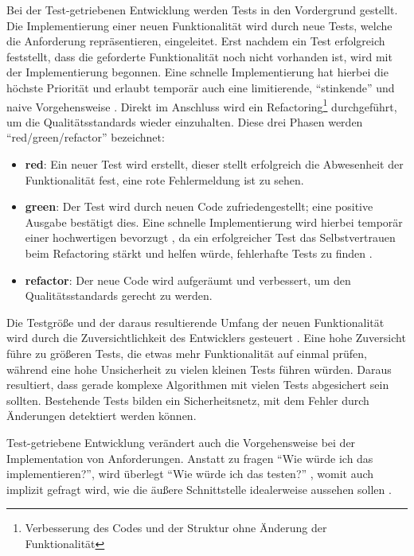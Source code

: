 Bei der Test-getriebenen Entwicklung werden Tests in den Vordergrund gestellt.
Die Implementierung einer neuen Funktionalität wird durch neue Tests, welche die Anforderung repräsentieren, eingeleitet.
Erst nachdem ein Test erfolgreich feststellt, dass die geforderte Funktionalität noch nicht vorhanden ist, wird mit der Implementierung begonnen.
Eine schnelle Implementierung hat hierbei die höchste Priorität und erlaubt temporär auch eine limitierende, \enquote{stinkende} und naive Vorgehensweise \cite[7]{tdd}.
Direkt im Anschluss wird ein Refactoring\footnote{Verbesserung des Codes und der Struktur ohne Änderung der Funktionalität} durchgeführt, um die Qualitätsstandards wieder einzuhalten.
Diese drei Phasen werden \enquote{red/green/refactor} bezeichnet:

\begin{itemize}
	\item \textbf{red}: Ein neuer Test wird erstellt, dieser stellt erfolgreich die Abwesenheit der Funktionalität fest, eine rote Fehlermeldung ist zu sehen.
	\item \textbf{green}: Der Test wird durch neuen Code zufriedengestellt; eine positive Ausgabe bestätigt dies. Eine schnelle Implementierung wird hierbei temporär einer hochwertigen bevorzugt \cite[24]{tdd}, da ein erfolgreicher Test das Selbstvertrauen beim Refactoring stärkt und helfen würde, fehlerhafte Tests zu finden \cite[152]{tdd}.
	\item \textbf{refactor}: Der neue Code wird aufgeräumt und verbessert, um den Qualitätsstandards gerecht zu werden.
\end{itemize}

Die Testgröße und der daraus resultierende Umfang der neuen Funktionalität wird durch die Zuversichtlichkeit des Entwicklers gesteuert \cite[42]{tdd}.
Eine hohe Zuversicht führe zu größeren Tests, die etwas mehr Funktionalität auf einmal prüfen, während eine hohe Unsicherheit zu vielen kleinen Tests führen würden.
Daraus resultiert, dass gerade komplexe Algorithmen mit vielen Tests abgesichert sein sollten.
Bestehende Tests bilden ein Sicherheitsnetz, mit dem Fehler durch Änderungen detektiert werden können.

Test-getriebene Entwicklung verändert auch die Vorgehensweise bei der Implementation von Anforderungen. Anstatt zu fragen \enquote{Wie würde ich das implementieren?}, wird überlegt \enquote{Wie würde ich das testen?} \cite[39]{tdd}, womit auch implizit gefragt wird, wie die äußere Schnittstelle idealerweise aussehen sollen \cite[4]{tdd}.


